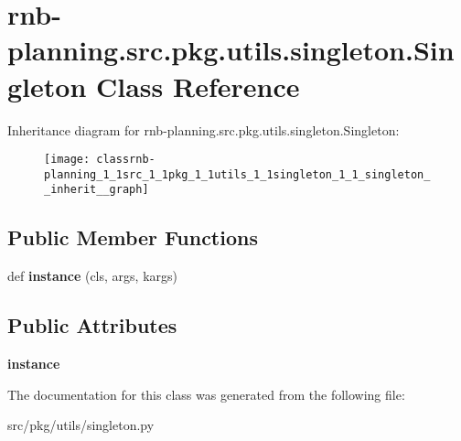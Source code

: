 \hypertarget{classrnb-planning_1_1src_1_1pkg_1_1utils_1_1singleton_1_1_singleton}{}\section{rnb-\/planning.src.\+pkg.\+utils.\+singleton.\+Singleton Class Reference}
\label{classrnb-planning_1_1src_1_1pkg_1_1utils_1_1singleton_1_1_singleton}


Inheritance diagram for rnb-\/planning.src.\+pkg.\+utils.\+singleton.\+Singleton\+:
\nopagebreak
\begin{figure}[H]
\begin{center}
\leavevmode
\texttt{[image: classrnb-planning\_1\_1src\_1\_1pkg\_1\_1utils\_1\_1singleton\_1\_1\_singleton\_\_inherit\_\_graph]}
\end{center}
\end{figure}
\subsection*{Public Member Functions}
\begin{DoxyCompactItemize}
\item 
\mbox{\label{classrnb-planning_1_1src_1_1pkg_1_1utils_1_1singleton_1_1_singleton_ab2d4703186ff50c41372439517045bf6}} 
def {\bfseries instance} (cls, args, kargs)
\end{DoxyCompactItemize}
\subsection*{Public Attributes}
\begin{DoxyCompactItemize}
\item 
\mbox{\label{classrnb-planning_1_1src_1_1pkg_1_1utils_1_1singleton_1_1_singleton_aba2f3c0282609ccbd36e6d105691f1ec}} 
{\bfseries instance}
\end{DoxyCompactItemize}


The documentation for this class was generated from the following file\+:\begin{DoxyCompactItemize}
\item 
src/pkg/utils/singleton.\+py\end{DoxyCompactItemize}
